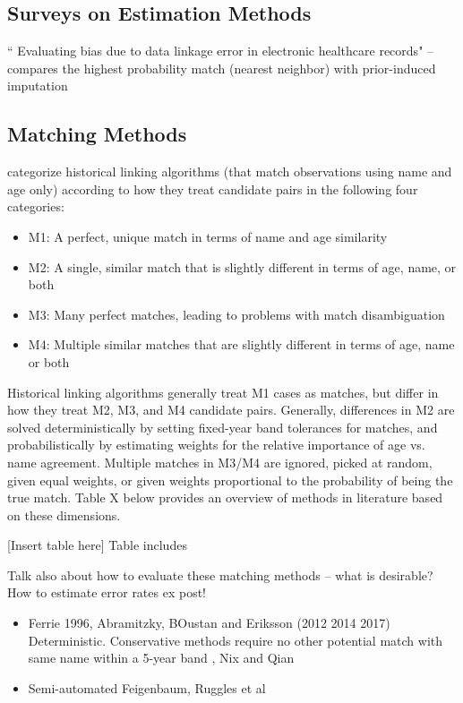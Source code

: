 \documentclass[12pt]{article}
\begin{document}
\subsection{Surveys on Estimation Methods}
`` Evaluating bias due to data linkage error in
electronic healthcare records" -- compares the highest probability match (nearest neighbor) with prior-induced imputation

\subsection{Matching Methods}

\cite{bailey2017} categorize historical linking algorithms (that match observations using name and age only) according to how they treat candidate pairs in the following four categories:
\begin{itemize}
\item M1: A perfect, unique match in terms of name and age similarity 
\item M2: A single, similar match that is slightly different in terms of age, name, or both
\item M3: Many perfect matches, leading to problems with match disambiguation
\item M4:  Multiple similar matches that are slightly different in terms of age, name or both 
\end{itemize}
Historical linking algorithms generally treat M1 cases as matches, but differ in how they treat M2, M3, and M4 candidate pairs.   Generally, differences in M2 are solved deterministically by setting fixed-year band tolerances for matches, and probabilistically by estimating weights for the relative importance of age vs. name agreement.  Multiple matches in M3/M4 are ignored, picked at random, given equal weights, or given weights proportional to the probability of being the true match.  Table X below provides an overview of methods in literature based on these dimensions. 

[Insert table here] 
Table includes 

Talk also about how to evaluate these matching methods -- what is desirable? How to estimate error rates ex post! 

\begin{itemize}
\item Ferrie 1996, Abramitzky, BOustan and Eriksson (2012 2014 2017) Deterministic.  Conservative methods require no other potential match with same name within a 5-year band , Nix and Qian
\item Semi-automated Feigenbaum, Ruggles et al 

\end{itemize}
\end{document}
